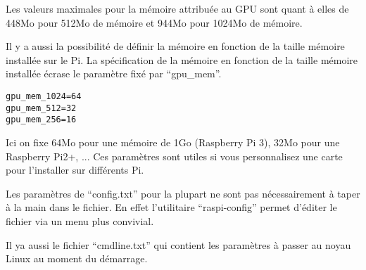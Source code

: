 Les valeurs maximales pour la mémoire attribuée au GPU sont quant à elles de 448Mo pour 512Mo de mémoire et 944Mo pour 1024Mo de mémoire.

Il y a aussi la possibilité de définir la mémoire en fonction de la taille mémoire installée sur le Pi. La spécification de la mémoire en fonction de la taille mémoire installée écrase le paramètre fixé par ``gpu\_mem''.

\begin{verbatim}
gpu_mem_1024=64
gpu_mem_512=32
gpu_mem_256=16
\end{verbatim}

Ici on fixe 64Mo pour une mémoire de 1Go (Raspberry Pi 3), 32Mo pour une Raspberry Pi2+, ... Ces paramètres sont utiles si vous personnalisez une carte pour l'installer sur différents Pi.

Les paramètres de ``config.txt'' pour la plupart ne sont pas nécessairement à taper à la main dans le fichier. En effet l'utilitaire ``raspi-config'' permet d'éditer le fichier via un menu plus convivial.

Il ya aussi le fichier ``cmdline.txt'' qui contient les paramètres à passer au noyau Linux au moment du démarrage.